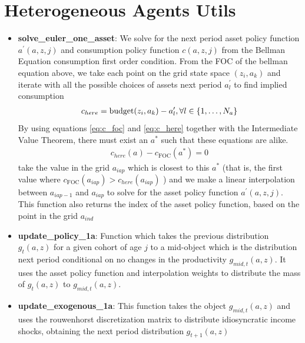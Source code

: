 \documentclass[12pt]{article} %
\theoremstyle{theorem}
\theoremstyle{definition}
\begin{document}
\section*{Heterogeneous Agents Utils}

\begin{itemize}
\item \textbf{solve\_euler\_one\_asset}: We solve for the next period asset policy function $a^{\prime}(a,z,j)$ and consumption policy function $c(a,z,j)$ from the Bellman Equation consumption first order condition.
 From the FOC of the bellman equation above, we take each point on the grid state space $(z_i,a_k)$ and iterate with all the possible choices of assets next period $a^{\prime}_{l}$ to find implied consumption
\begin{align} \label{eq:c_here}
c_{here} = \text{budget}(z_i,a_k) - a^{\prime}_{l}, \vspace{2mm} \forall l \in \{1,\ldots,N_{a}\}
\end{align} 
By using equations \eqref{eq:c_foc} and \eqref{eq:c_here} together with the Intermediate Value Theorem, there must exist an $a^*$ such that these equations are alike.
\begin{align*}
c_{here}(a) - c_{\text{FOC}}(a^*) = 0
\end{align*}
take the value in the grid $a_{iap}$ which is closest to this $a^*$ (that is, the first value where $c_{\text{FOC}}(a_{iap}) > c_{here}(a_{iap}) $ ) and we make a linear interpolation between $a_{iap-1}$ and $a_{iap}$ to solve for the asset policy function $a^{\prime}(a,z,j)$. This function also returns the index of the asset policy function, based on the point in the grid $a_{ind}$
\item \textbf{update\_policy\_1a}: Function which takes the previous distribution $g_{t}(a,z)$ for a given cohort of age $j$ to a mid-object which is the distribution next period conditional on no changes in the productivity $g_{mid,t}(a,z)$. It uses the asset policy function and interpolation weights to distribute the mass of $g_{t}(a,z)$ to $g_{mid,t}(a,z)$. 
\item \textbf{update\_exogenous\_1a}: This function takes the object $g_{mid,t}(a,z)$ and uses the rouwenhorst discretization matrix to distribute idiosyncratic income shocks, obtaining the next period distribution $g_{t+1}(a,z)$
\end{itemize}
\end{document}
